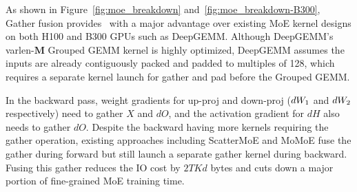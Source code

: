 As shown in Figure~\ref{fig:moe_breakdown} and~\ref{fig:moe_breakdown-B300}, Gather fusion provides \Algname~with a major advantage over existing MoE kernel designs on both H100 and B300 GPUs such as DeepGEMM. Although DeepGEMM's varlen-$\mathbf{M}$ Grouped GEMM kernel is highly optimized, DeepGEMM assumes the inputs are already contiguously packed and padded to multiples of 128, which requires a separate kernel launch for gather and pad before the Grouped GEMM. 

In the backward pass, weight gradients for up-proj and down-proj ($dW_{1}$ and $dW_{2}$ respectively) need to gather $X$ and $dO$, and the activation gradient for $dH$ also needs to gather $dO$. Despite the backward having more kernels requiring the gather operation, existing approaches including ScatterMoE \citep{tan2024scattered} and MoMoE \citep{costin2025momoe} fuse the gather during forward but still launch a separate gather kernel during backward. Fusing this gather reduces the IO cost by $2TKd$ bytes and cuts down a major portion of fine-grained MoE training time. 











